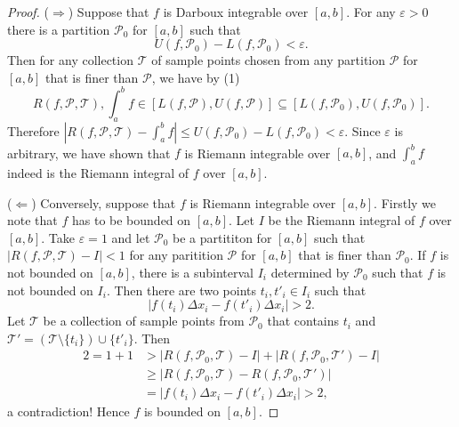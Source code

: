 \begin{proof}
  ($\Longrightarrow$) Suppose that $f$ is Darboux integrable over $[a,b]$.
  For any $\varepsilon > 0$ there is a partition $\mathcal{P}_0$ for $[a,b]$ such that
  \[
    U(f,\mathcal{P}_0) - L(f,\mathcal{P}_0) < \varepsilon.
  \]
  Then for any collection $\mathcal{T}$ of sample points chosen from any partition $\mathcal{P}$ for $[a,b]$ that is finer than $\mathcal{P}$, we have by (1)
  \[
    R(f,\mathcal{P},\mathcal{T}), \int_a^b f \in [ L(f,\mathcal{P}), U(f,\mathcal{P}) ] \subseteq [ L(f,\mathcal{P}_0), U(f,\mathcal{P}_0)].
  \]
  Therefore $|R(f,\mathcal{P},\mathcal{T}) - \int_a^b f| \leqslant U(f,\mathcal{P}_0) - L(f,\mathcal{P}_0) < \varepsilon$.
  Since $\varepsilon$ is arbitrary, we have shown that $f$ is Riemann integrable over $[a,b]$, and $\int_a^b f$ indeed is the Riemann integral of $f$ over $[a,b]$.

  ($\Longleftarrow$) Conversely, suppose that $f$ is Riemann integrable over $[a,b]$.
  Firstly we note that $f$ has to be bounded on $[a,b]$.
  Let $I$ be the Riemann integral of $f$ over $[a,b]$.
  Take $\varepsilon = 1$ and let $\mathcal{P}_0$ be a partititon for $[a,b]$ such that $|R(f,\mathcal{P},\mathcal{T}) - I| < 1$ for any paritition $\mathcal{P}$ for $[a,b]$ that is finer than $\mathcal{P}_0$.
  If $f$ is not bounded on $[a,b]$, there is a subinterval $I_i$ determined by $\mathcal{P}_0$ such that $f$ is not bounded on $I_i$.  Then there are two points $t_i, t'_i \in I_i$ such that
  \[
    | f(t_i) \Delta x_i - f(t'_i) \Delta x_i | > 2.
  \]
  Let $\mathcal{T}$ be a collection of sample points from $\mathcal{P}_0$ that contains $t_i$ and $\mathcal{T}' = (\mathcal{T} \setminus \{ t_i \}) \cup \{ t'_i \}$.  Then
  \begin{align*}
    2 = 1 + 1 &> |R(f,\mathcal{P}_0,\mathcal{T}) - I| + |R(f,\mathcal{P}_0,\mathcal{T}') - I| \\
    &\geqslant |R(f,\mathcal{P}_0,\mathcal{T}) - R(f,\mathcal{P}_0,\mathcal{T}')| \\
    &= | f(t_i) \Delta x_i - f(t'_i) \Delta x_i | > 2,
  \end{align*}
  a contradiction!  Hence $f$ is bounded on $[a,b]$.


\end{proof}
